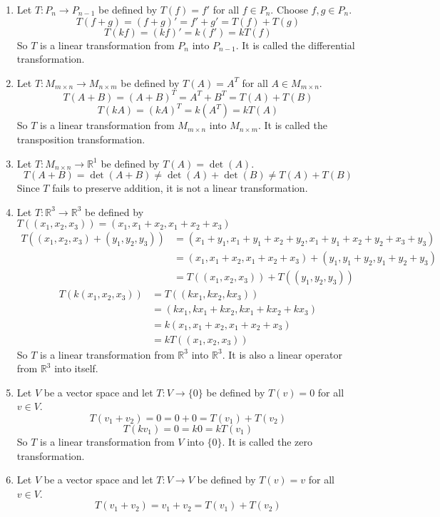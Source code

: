 \documentclass[12pt]{article}
\begin{document}
 \begin{example} \begin{enumerate} 
 \item Let $T: P_n \to P_{n - 1}$ be defined by $T(f) = f'$ for all $f \in P_n$. Choose $f, g \in P_n$. $$T(f + g) = (f + g)' = f' + g' = T(f) + T(g) $$ 
 $$T(kf) = (kf)' = k(f') = kT(f) $$ So $T$ is a linear transformation from $P_n$ into $P_{n - 1}$. It is called the differential transformation. 
 \item Let $T: M_{m \times n} \to M_{n \times m}$ be defined by $T(A) = A^T$ for all $A \in M_{m \times n}$. $$T(A + B) = (A + B)^T = A^T + B^T = T(A) + T(B) $$ 
 $$T(kA) = (kA)^T = k(A^T) = kT(A) $$ So $T$ is a linear transformation from $M_{m \times n}$ into $M_{n \times m}$. It is called the transposition transformation. 
 \item Let $T: M_{n \times n} \to \mathbb{R}^1$ be defined by $T(A) = \det(A)$. $$T(A + B) = \det(A + B) \neq \det(A) + \det(B) \neq T(A) + T(B) $$ Since $T$ fails to preserve addition, it is not a linear transformation. 
 \item Let $T: \mathbb{R}^3 \to \mathbb{R}^3$ be defined by $T((x_1, x_2, x_3)) = (x_1, x_1 + x_2, x_1 + x_2 + x_3)$ $$\begin{aligned} T((x_1, x_2, x_3) + (y_1, y_2, y_3)) &= (x_1 + y_1, x_1 + y_1 + x_2 + y_2, x_1 + y_1 + x_2 + y_2 + x_3 + y_3) \\ &= (x_1, x_1 + x_2, x_1 + x_2 + x_3) + (y_1, y_1 + y_2, y_1 + y_2 + y_3) \\ &= T((x_1, x_2, x_3)) + T((y_1, y_2, y_3)) \end{aligned} $$ $$\begin{aligned} T(k(x_1, x_2, x_3)) &= T((kx_1, kx_2, kx_3)) \\ &= (kx_1, kx_1 + kx_2, kx_1 + kx_2 + kx_3) \\ &= k(x_1, x_1 + x_2, x_1 + x_2 + x_3) \\ &= kT((x_1, x_2, x_3)) \end{aligned} $$ So $T$ is a linear transformation from $\mathbb{R}^3$ into $\mathbb{R}^3$. It is also a linear operator from $\mathbb{R}^3$ into itself. 
 \item Let $V$ be a vector space and let $T: V \to \{0\}$ be defined by $T(v) = 0$ for all $v \in V$. $$T(v_1 + v_2) = 0 = 0 + 0 = T(v_1) + T(v_2) $$ 
 $$T(kv_1) = 0 = k0 = kT(v_1) $$ So $T$ is a linear transformation from $V$ into $\{0\}$. It is called the zero transformation. 
 \item Let $V$ be a vector space and let $T: V \to V$ be defined by $T(v) = v$ for all $v \in V$. $$T(v_1 + v_2) = v_1 + v_2 = T(v_1) + T(v_2) $$ 

\end{enumerate}
\end{example}
\end{document}
